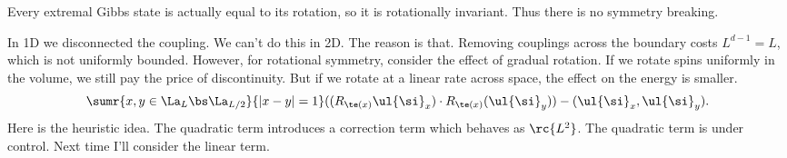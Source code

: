 Every extremal Gibbs state is actually equal to its rotation, so it is rotationally invariant. Thus there is no symmetry breaking.

In 1D we disconnected the coupling. We can't do this in 2D. The reason is that. Removing couplings across the boundary costs $L^{d-1}=L$, which is not uniformly bounded. However, for rotational symmetry, consider the effect of gradual rotation. If we rotate spins uniformly in the volume, we still pay the price of discontinuity. But if we rotate at a linear rate across space, the effect on the energy is smaller.
\[
\sumr{x,y\in \La_L\bs \La_{L/2}}{|x-y|=1} ((R_{\te(x)}\ul{\si}_x)\cdot R_{\te(x)}(\ul{\si}_y)) - (\ul{\si}_x,\ul{\si}_y) .
\]
Here is the heuristic idea. %
The quadratic term introduces a correction term which behaves as $\rc{L^2}$. The quadratic term is under control. Next time I'll consider the linear term.



